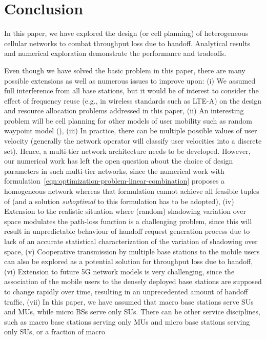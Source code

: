 \documentclass[10pt,journal]{IEEEtran}
\begin{document}
\section{Conclusion}\label{section:conclusion}
In this paper, we have explored the design (or cell planning) of heterogeneous cellular networks to combat throughput 
loss due to handoff. Analytical results and numerical exploration demonstrate the performance and tradeoffs.

Even though we have solved the basic problem in this paper, there are many possible extensions as well as 
numerous issues to improve upon: 
(i) We assumed full interference from all base stations, but it would be of interest to consider the effect of frequency reuse 
(e.g., in wireless standards such as LTE-A) on the design and resource allocation problems addressed in this paper, (ii) An interesting problem will be 
cell planning for other models of user mobility such as random waypoint model (\cite{hyytia-virtamo13random-waypoint-model}), 
(iii) In practice, there can be multiple possible values of user velocity 
(generally the network operator will classify user velocities into a discrete set). 
Hence, a multi-tier network architecture needs to be developed. However, our numerical work has left the open question about the choice of 
design parameters in such multi-tier networks, since the numerical work with formulation~\eqref{eqn:optimization-problem-linear-combination} 
proposes a homogeneous network whereas that formulation cannot achieve all feasible tuples of  (and 
a solution {\em suboptimal} to this formulation has to be adopted),  
(iv) Extension to the realistic situation where (random) shadowing variation over space modulates the path-loss function is a challenging problem, since 
this will result in unpredictable behaviour of handoff request generation process due to lack of 
an accurate statistical characterization of the variation of shadowing over space, 
(v) Cooperative transmission by multiple base stations to the mobile users can also be explored as 
a potential solution for throughput loss due to handoff, 
(vi) Extension to future 5G network models is very challenging, since the association of the mobile users to the densely 
deployed base stations are supposed to change rapidly over time, resulting in an unprecedented amount of handoff traffic, 
(vii) In this paper, we have assumed that macro base stations serve SUs and MUs, while micro BSs serve only SUs. There can be other 
service disciplines, such as macro base stations serving only MUs and micro base stations serving only SUs, or a fraction of macro 
\end{document}
